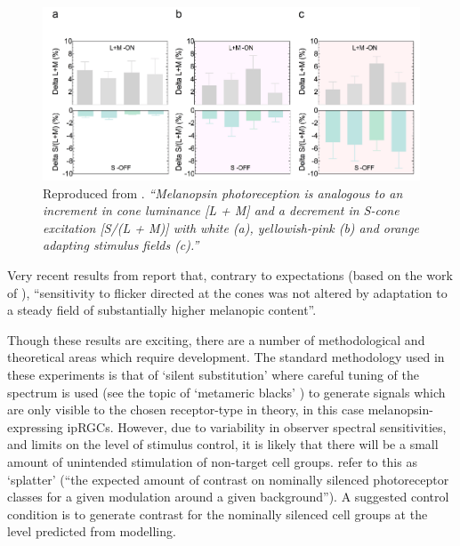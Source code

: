 \begin{figure}[htbp]
\includegraphics[max width=\textwidth, center]{figs/LitRev/zele.png}
\caption{Reproduced from \citet{zele_melanopsin_2018}. \textit{``Melanopsin photoreception is analogous to an increment in cone luminance [L + M] and a decrement in S-cone excitation [S/(L + M)] with white (a), yellowish-pink (b) and orange adapting stimulus fields (c).''}}
\label{fig:zele}
\end{figure}

Very recent results from \citet{vincent_adaptation_2019,vincent_adaptation_2019-1} report that, contrary to expectations (based on the work of \citet{allen_melanopsin-driven_2014}), ``sensitivity to flicker directed at the cones was not altered by adaptation to a steady field of substantially higher melanopic content''. 

Though these results are exciting, there are a number of methodological and theoretical areas which require development. The standard methodology used in these experiments is that of `silent substitution' where careful tuning of the spectrum is used (see the topic of `metameric blacks' \citep{vienot_verriest_2014,cohen_metameric_1982,vienot_domain_2012,vienot_dimensionality_2015}) to generate signals which are only visible to the chosen receptor-type in theory, in this case melanopsin-expressing \glspl{ipRGC}. However, due to variability in observer spectral sensitivities, and limits on the level of stimulus control, it is likely that there will be a small amount of unintended stimulation of non-target cell groups. \citet{spitschan_selective_2015} refer to this as `splatter' (``the expected amount of contrast on nominally silenced photoreceptor classes for a given modulation around a given background''). A suggested control condition is to generate contrast for the nominally silenced cell groups at the level predicted from modelling.



\clearpage


